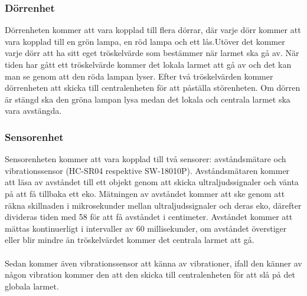 \documentclass{article}
\begin{document}
\subsubsection{Dörrenhet}

Dörrenheten kommer att vara kopplad till flera dörrar, där varje dörr kommer att vara kopplad till en grön lampa, en röd lampa och ett lås.Utöver det kommer varje dörr att ha sitt eget tröskelvärde som bestämmer när larmet ska gå av. 
När tiden har gått ett tröskelvärde kommer det lokala larmet att gå av och det kan man se genom att den röda lampan lyser. 
Efter två tröskelvärden kommer dörrenheten att skicka till centralenheten för att påställa störenheten. 
Om dörren är stängd ska den gröna lampan lysa medan det lokala och centrala larmet ska vara avstängda. 

\subsubsection{Sensorenhet}

Sensorenheten kommer att vara kopplad till två sensorer: avståndsmätare och vibrationssensor (HC-SR04 respektive SW-18010P).
Avståndsmätaren kommer att läsa av avståndet till ett objekt genom att skicka ultraljudssignaler och vänta på att få tillbaka ett eko. 
Mätningen av avståndet kommer att ske genom att räkna skillnaden i mikrosekunder mellan ultraljudssignaler och deras eko, därefter divideras tiden med 58 för att få avståndet i centimeter. 
Avståndet kommer att mättas kontinuerligt i intervaller av 60 millisekunder, om avståndet överstiger eller blir mindre än tröskelvärdet kommer det centrala larmet att gå.\\
\\
Sedan kommer även vibrationssensor att känna av vibrationer, ifall den känner av någon vibration kommer den att den skicka till centralenheten för att slå på det globala larmet.
\end{document}
